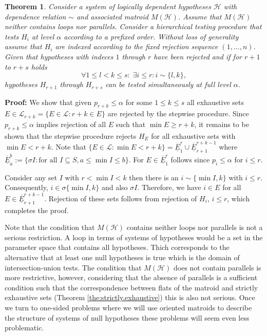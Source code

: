 \documentclass[a4paper,12pt]{article}
\newtheorem{theorem}{Theorem}
\newenvironment{proof}[1][Proof]{\noindent\textbf{#1:} }{}
\begin{document}
\begin{theorem}
  Consider a system of logically dependent hypotheses $\mathscr{H}$
  with dependence relation $\sim$ and associated matroid
  $M(\mathscr{H})$. Assume that $M(\mathscr{H})$ neither contains
  loops nor parallels. Consider a hierarchical testing procedure that
  tests $H_{i}$ at level $\alpha$ according to a prefixed
  order. Without loss of generality assume that $H_i$ are indexed
  according to the fixed rejection sequence $(1,...,n)$. Given 
  that hypotheses with indeces $1$ through $r$ have been
  rejected and if for $r+1$ to $r+s$ holds
  \begin{equation}
    \label{eq:cond.hierarchical}
    \forall 1 \leq l < k \leq s: \; \exists i \leq r: i \sim \{l,k\},
  \end{equation}
  hypotheses $H_{r+1}$ through $H_{r+s}$ can be tested simultaneously
  at full level $\alpha$.
\end{theorem}

\begin{proof}
  We show that given $p_{r+k} \leq \alpha$ for some $1 \leq k \leq s$
  all exhaustive sets $E \in \mathscr{L}_{r+k} = \{E \in \mathscr{L}:
  r+k \in E\}$ are rejected by the stepwise procedure. Since $p_{r+k}
  \leq \alpha$ implies rejection of all $E$ such that $\min E \geq
  r+k$, it remains to be shown that the stepwise procedure rejects
  $H_E$ for all exhaustive sets with $\min E < r+k$. Note that $\{E
  \in \mathscr{L}: \min E < r+k\} = \overline{\underline{E}}_1^r \cup
  \overline{\underline{E}}^{r+k-1}_{r+1}$ where
  $\overline{\underline{E}}^b_a := \{\sigma I: \text{for all } I
  \subseteq S, a \leq \min I \leq b\}$. For $ E \in
  \overline{\underline{E}}_1^r$ follows since $p_i \leq \alpha$ for $i
  \leq r$.

  Consider any set $I$ with $r < \min I < k$ then there is an $i \sim
  \{\min I,k\}$ with $i \leq r$. Consequently, $i \in \sigma \{\min
  I,k\}$ and also $\sigma I$. Therefore, we have $i \in E$ for all $E
  \in \overline{\underline{E}}^{r+k-1}_{r+1}$. Rejection of these sets
  follows from rejection of $H_i$, $i \leq r$, which completes the
  proof.
\end{proof}

Note that the condition that $M(\mathscr{H})$ contains neither loops
nor parallels is not a serious restriction. A loop in terms of systems
of hypotheses would be a set in the parameter space that contains all
hypotheses. Thich corresponds to the alternative that at least one
null hypotheses is true which is the domain of intersection-union
tests. The condition that $M(\mathscr{H})$ does not contain parallels
is more restrictive, however, considering that the absence of
parallels is a sufficient condition such that the correspondence
between flats of the matroid and strictly exhaustive sets (Theorem
\ref{the:strictly.exhaustive}) this is also not serious. Once we turn
to one-sided problems where we will use oriented matroids to describe
the structure of systems of null hypotheses these problems will seem
even less problematic.
\end{document}
